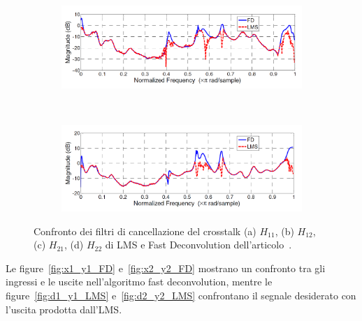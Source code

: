 \documentclass[12pt,a4paper,titlepage]{article}
\begin{document}
\begin{figure}[h]
	\ContinuedFloat
	\centering
	\begin{subfigure}{1\textwidth}
		\includegraphics[width=1\textwidth]{Immagini/H21_paper}
		\caption{}
		\label{fig:Confronto_H21_LMS_FD_paper}
	\end{subfigure}\\
	\begin{subfigure}{1\textwidth}
		\includegraphics[width=1\textwidth]{Immagini/H22_paper}
		\caption{}
		\label{fig:Confronto_H22_LMS_FD_paper}
	\end{subfigure}
	\caption{Confronto dei filtri di cancellazione del crosstalk (a) $H_{11}$, (b) $H_{12}$, (c) $H_{21}$, (d) $H_{22}$ di LMS e Fast Deconvolution dell'articolo~\cite{Li:comprehensive_comparison}.}
	\label{fig:confronto_H_LMS_FD_paper}
\end{figure}

Le figure~\ref{fig:x1_y1_FD} e~\ref{fig:x2_y2_FD} mostrano un confronto tra gli ingressi e le uscite nell'algoritmo fast deconvolution, mentre le figure~\ref{fig:d1_y1_LMS} e~\ref{fig:d2_y2_LMS} confrontano il segnale desiderato con l'uscita prodotta dall'LMS.
\end{document}
